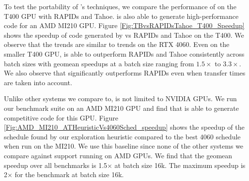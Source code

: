 To test the portability of \Treebeard{}'s techniques, we compare the performance 
of \Treebeard{} on the T400 GPU with RAPIDs and Tahoe. \Treebeard{} is also 
able to generate high-performance code for an AMD MI210 GPU. Figure \ref{Fig:TBvsRAPIDsTahoe_T400_Speedup}
shows the speedup of code generated by \Treebeard{} vs RAPIDs and Tahoe on the T400.
We observe that the trends are similar to trends on the RTX 4060. Even on the smaller T400 GPU, \Treebeard{} is able to outperform RAPIDs
and Tahoe consistently across batch sizes with geomean speedups at a batch size ranging from $1.5\times$ to $3.3\times$.
We also observe that \Treebeard{} significantly outperforms RAPIDs even when transfer times are 
taken into account.

Unlike other systems we compare to, \Treebeard{} is not limited to NVIDIA GPUs. We 
run our benchmark suite on an AMD MI210 GPU and find that \Treebeard{} is able to
generate competitive code for this GPU. Figure \ref{Fig:AMD_MI210_ATHeuristicVs4060Sched_speedup}
shows the speedup of the schedule found by our exploration heuristic compared to the best 
4060 schedule when run on the MI210. We use this baseline since none of the other systems
we compare against support running on AMD GPUs. We find that the geomean speedup over all benchmarks is 1.5$\times$ at batch size 16k.
The maximum speedup is 2$\times$ for the  benchmark at batch size 16k. 


